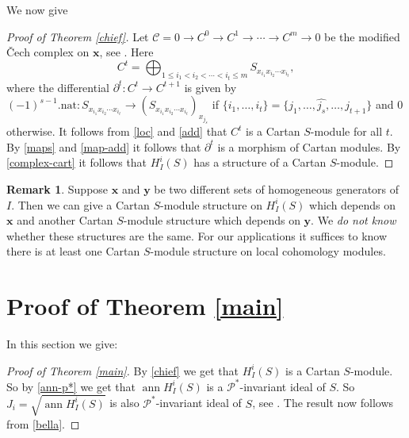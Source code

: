 \documentclass{amsart}
\newcommand{\xb}{\mathbf{x} }
\newcommand{\yb}{\mathbf{y} }
\newcommand{\Pc}{\mathcal{P} }
\newcommand{\rt}{\rightarrow}
\newcommand{\wh}{\widehat }
\newcommand{\ann}{\operatorname{ann}}
\theoremstyle{plain}
\theoremstyle{definition}
\newtheorem{remark}[theorem]{Remark}
\theoremstyle{remark}
\begin{document}
We now give
\begin{proof}[Proof of Theorem \ref{chief}]
Let $\mathcal{C} = 0 \rt C^0 \rt C^1 \rt \cdots \rt C^m \rt 0$ be the modified \v{C}ech complex on $\xb$, see \cite[5.1.5]{bs}. Here
$$ C^t = \bigoplus_{1 \leq i_1< i_2 < \cdots<i_t \leq m}S_{x_{i_1}x_{i_2}\cdots x_{i_t}},$$
where the differential $\partial^t \colon C^t \rt C^{t+1}$ is given by \\  $(-1)^{s-1}.\text{nat}\colon S_{x_{i_1}x_{i_2}\cdots x_{i_t}} \rt (S_{x_{i_1}x_{i_2}\cdots x_{i_t}})_{x_{j_s}}$ if
$\{ i_1, \ldots, i_t \} = \{ j_1, \ldots, \wh{j_s}, \ldots, j_{t+1} \}$ and $0$ otherwise. It follows from \ref{loc} and \ref{add} that $C^t$ is a Cartan $S$-module for all $t$. By \ref{maps} and \ref{map-add} it follows that $\partial^t$ is a morphism of Cartan modules. By \ref{complex-cart} it follows that $H^i_I(S)$ has a structure of a Cartan $S$-module.
\end{proof}

\begin{remark}
Suppose $\xb$ and $\yb$ be two different sets of homogeneous generators of $I$. Then  we can give a Cartan $S$-module structure on $H^i_I(S)$ which depends on $\xb$ and another Cartan $S$-module structure which depends on $\yb$. We \emph{do not know} whether these structures are the same. For our applications it suffices to know there is at least one Cartan $S$-module structure on local cohomology modules.
\end{remark}

\section{Proof of Theorem \ref{main}}
In this section we give:
\begin{proof}[Proof of Theorem \ref{main}]
By \ref{chief} we get that $H^i_I(S)$ is a Cartan $S$-module. So by \ref{ann-p*} we get that $\ann H^i_I(S)$ is a $\Pc^*$-invariant ideal of $S$. So $J_i = \sqrt{\ann H^i_I(S)}$ is also $\Pc^*$-invariant ideal of $S$, see \cite[11.2.5]{SL}.  The result now follows from \ref{bella}.
\end{proof}
\end{document}
